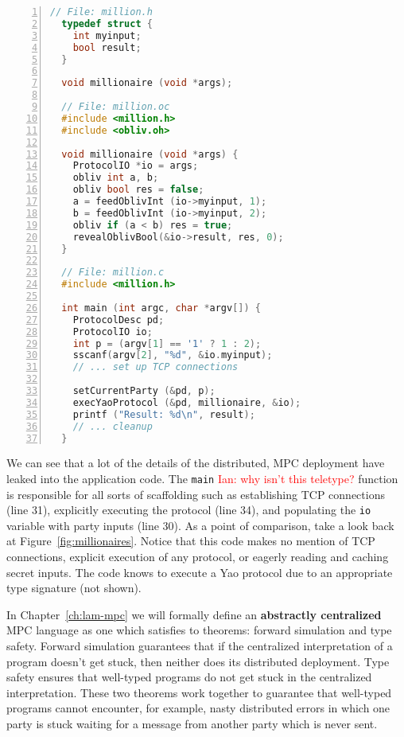 \documentclass{report}
\newcommand{\ins}[1]{\textcolor{red}{Ian: #1}}
\begin{document}
\begin{lstlisting}[language=c,basicstyle=\footnotesize,numbers=left,stepnumber=1]
  // File: million.h
  typedef struct {
    int myinput;
    bool result;
  }

  void millionaire (void *args);

  // File: million.oc
  #include <million.h>
  #include <obliv.oh>

  void millionaire (void *args) {
    ProtocolIO *io = args;
    obliv int a, b;
    obliv bool res = false;
    a = feedOblivInt (io->myinput, 1);
    b = feedOblivInt (io->myinput, 2);
    obliv if (a < b) res = true;
    revealOblivBool(&io->result, res, 0);
  }

  // File: million.c
  #include <million.h>

  int main (int argc, char *argv[]) {
    ProtocolDesc pd;
    ProtocolIO io;
    int p = (argv[1] == '1' ? 1 : 2);
    sscanf(argv[2], "%d", &io.myinput);
    // ... set up TCP connections

    setCurrentParty (&pd, p);
    execYaoProtocol (&pd, millionaire, &io);
    printf ("Result: %d\n", result);
    // ... cleanup
  }
\end{lstlisting}

We can see that a lot of the details of the distributed, MPC deployment have leaked into the application code. The
\lstinline[language=c]{main} \ins{why isn't this teletype?} function is responsible for all sorts of scaffolding such as establishing TCP connections (line 31),
explicitly executing the protocol (line 34), and populating the \lstinline[language=c]{io} variable with party inputs (line 30). As
a point of comparison, take a look back at Figure~\ref{fig:millionaires}. Notice that this code makes no mention of TCP connections,
explicit execution of any protocol, or eagerly reading and caching secret inputs. The code knows to execute a Yao protocol due to
an appropriate type signature (not shown).

In Chapter~\ref{ch:lam-mpc} we will formally define an \textbf{abstractly centralized} MPC language as one which satisfies to theorems:
forward simulation and type safety. Forward simulation guarantees that if the centralized interpretation of a program doesn't get stuck,
then neither does its distributed deployment. Type safety ensures that well-typed programs do not get stuck in the centralized interpretation.
These two theorems work together to guarantee that well-typed programs cannot encounter, for example, nasty distributed errors in
which one party is stuck waiting for a message from another party which is never sent.
\end{document}

